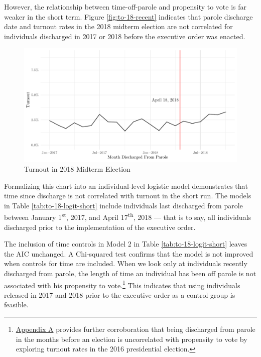 \documentclass[
  12pt,
]{article}
\begin{document}
However, the relationship between time-off-parole and propensity to vote is far weaker in the short term. Figure \ref{fig:to-18-recent} indicates that parole discharge date and turnout rates in the 2018 midterm election are not correlated for individuals discharged in 2017 or 2018 before the executive order was enacted.

\begin{figure}[H]

{\centering \includegraphics{part2_standalone_files/figure-latex/to-18-recent-chart-1} 

}

\caption{\label{fig:to-18-recent}Turnout in 2018 Midterm Election}\label{fig:to-18-recent-chart}
\end{figure}

Formalizing this chart into an individual-level logistic model demonstrates that time since discharge is not correlated with turnout in the short run. The models in Table \ref{tab:to-18-logit-short} include individuals last discharged from parole between January 1\textsuperscript{st}, 2017, and April 17\textsuperscript{th}, 2018 --- that is to say, all individuals discharged prior to the implementation of the executive order.



The inclusion of time controls in Model 2 in Table \ref{tab:to-18-logit-short} leaves the AIC unchanged. A Chi-squared test confirms that the model is not improved when controls for time are included. When we look only at individuals recently discharged from parole, the length of time an individual has been off parole is not associated with his propensity to vote.\footnote{\protect\hyperlink{appendix-a}{Appendix A} provides further corroboration that being discharged from parole in the months before an election is uncorrelated with propensity to vote by exploring turnout rates in the 2016 presidential election.} This indicates that using individuals released in 2017 and 2018 prior to the executive order as a control group is feasible.
\end{document}
